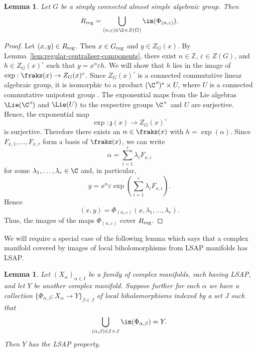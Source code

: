 \documentclass[12pt, a4paper, oneside]{amsart}
\theoremstyle{plain} %
\newtheorem{lemma}[theorem]{Lemma}
\theoremstyle{definition} %
\theoremstyle{remark} %
\begin{document}
\begin{lemma}\label{lem:Phi-cover-Rreg}
Let $G$ be a simply connected almost simple algebraic group. Then
\[R_{\rm reg} = \bigcup_{(n,\varepsilon)\in \Z\times Z(G)}\im(\Phi_{(n,\varepsilon)}).\]
\end{lemma}

\begin{proof}
Let $(x,y)\in R_{\rm reg}$. Then $x\in G_{\rm reg}$ and $y\in Z_G(x)$. By Lemma~\ref{lem:regular-centraliser-components}, there exist
$n\in\mathbb Z$, $\varepsilon\in Z(G)$, and $h\in Z_G(x)^\circ $ such that $y=x^n\varepsilon h$. We will show that $h$ lies in the image of $\exp:\frakz(x)\to Z_G(x)^\circ$. Since $Z_G(x)^\circ$ is a connected commutative linear algebraic group, it is isomorphic to a product $(\C^\times\!)^s\times U,$ where $U$ is a connected commutative unipotent group \cite[Section 1.6]{Car93}. The exponential maps from the Lie algebras $\Lie(\C^\times\!)$ and $\Lie(U)$ to the respective groups $\C^\times$ and $U$ are surjective. Hence, the exponential map
\[\exp:\mathfrak z(x)\longrightarrow Z_G(x)^\circ\]
is surjective. Therefore there exists an $ \alpha\in\frakz(x)$ with $h=\exp(\alpha)$. Since $F_{x,1},\dots,F_{x,r}$ form a basis of $\frakz(x)$, we can write
\[\alpha=\sum_{i=1}^r \lambda_iF_{x,i}\]
for some $\lambda_1,\dots,\lambda_r\in\C$ and, in particular,
\[y=x^n\varepsilon\exp\left(\sum_{i=1}^r \lambda_iF_{x,i}\right).\]
Hence
\[(x,y) = \Phi_{(n,\varepsilon)}(x,\lambda_1,\dots,\lambda_r).\]
Thus, the images of the maps $\Phi_{(n,\varepsilon)}$ cover $R_{\rm reg}$.
\end{proof}
We will require a special case of the following lemma which says that a complex manifold covered by images of local biholomorphisms from LSAP manifolds has LSAP.

\begin{lemma}\label{lem:LSAP-local-bihol}
Let $(X_\alpha)_{\alpha\in I}$ be a family of complex manifolds, each having LSAP, and let $Y$ be another complex manifold. Suppose further for each $\alpha$ we have a collection $\{\Phi_{\alpha,\beta}: X_{\alpha}\to Y\}_{\beta\in J}$ of local biholomorphisms indexed by a set $J$ such that 
\[\bigcup_{(\alpha,\beta)\in I\times J}\im(\Phi_{\alpha,\beta}) =Y.\]
Then $Y$ has the LSAP property.
\end{lemma}
\end{document}
